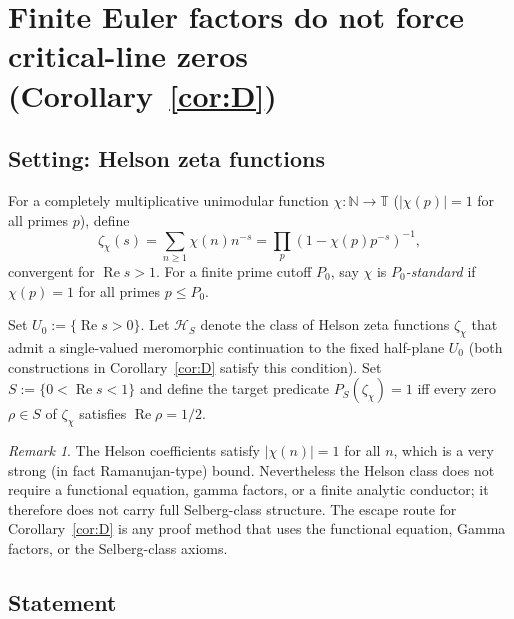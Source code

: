 \documentclass[12pt]{amsart}
\theoremstyle{definition}
\theoremstyle{remark}
\newtheorem{remark}[definition]{Remark}
\theoremstyle{plain}
\newcommand{\re}{\operatorname{Re}}
\newcommand{\TT}{\mathbb{T}}
\begin{document}
\section{Finite Euler factors do not force critical-line zeros
  (Corollary~\ref{cor:D})}
\label{sec:C}

\subsection{Setting: Helson zeta functions}
\label{sec:helson}

For a completely multiplicative unimodular function
$\chi : \mathbb{N} \to \TT$ ($|\chi(p)| = 1$ for all primes $p$), define
\[
  \zeta_\chi(s) = \sum_{n \geq 1} \chi(n) n^{-s}
               = \prod_p (1-\chi(p)p^{-s})^{-1},
\]
convergent for $\re s > 1$.  For a finite prime cutoff $P_0$, say $\chi$
is \emph{$P_0$-standard} if $\chi(p) = 1$ for all primes $p \leq P_0$.

Set $U_0 := \{\re s > 0\}$.  Let $\mathcal{H}_S$ denote the class of
Helson zeta functions $\zeta_\chi$ that admit a single-valued meromorphic
continuation to the fixed half-plane $U_0$ (both constructions in
Corollary~\ref{cor:D} satisfy this condition).  Set $S := \{0 < \re s < 1\}$
and define the target predicate $P_S(\zeta_\chi) = 1$ iff every zero
$\rho \in S$ of $\zeta_\chi$ satisfies $\re\rho = 1/2$.

\begin{remark}
The Helson coefficients satisfy $|\chi(n)| = 1$ for all $n$, which
is a very strong (in fact Ramanujan-type) bound.  Nevertheless the Helson
class does not require a functional equation, gamma factors, or a finite
analytic conductor; it therefore does not carry full Selberg-class
structure.  The escape route for Corollary~\ref{cor:D} is any proof method that
uses the functional equation, Gamma factors, or the Selberg-class axioms.
\end{remark}

\subsection{Statement}
\end{document}
